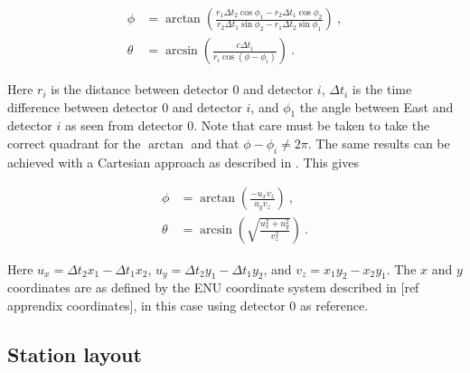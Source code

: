 \begin{equation}
    \label{eq:direction-2dflat}
    \begin{split}
        \phi &= \arctan \left(\frac{r_1 \Delta t_2 \cos \phi_1 - r_2 \Delta t_1 \cos \phi_2}{r_2 \Delta t_1 \sin \phi_2 - r_1 \Delta t_2 \sin \phi_1} \right) \ , \\
        \theta &= \arcsin \left(\frac{c \Delta t_i}{r_i \cos(\phi - \phi_i)} \right) \ .
    \end{split}
\end{equation}

Here $r_i$ is the distance between detector 0 and detector $i$, $\Delta t_i$ is the time difference between detector 0 and detector $i$, and $\phi_1$ the angle between East and detector $i$ as seen from detector 0. Note that care must be taken to take the correct quadrant for the $\arctan$ and that $\phi - \phi_i \ne 2 \pi$. The same results can be achieved with a Cartesian approach as described in \cite{montanus2015direction}. This gives

\begin{equation}
    \label{eq:direction-2dflat}
    \begin{split}
        \phi &= \arctan \left(\frac{-u_x v_z}{u_y v_z} \right) \ , \\
        \theta &= \arcsin \left(\sqrt{\frac{u_x^2+u_y^2}{v_z^2}} \right) \ .
    \end{split}
\end{equation}

Here $u_x = \Delta t_2 x_1 - \Delta t_1 x_2$, $u_y = \Delta t_2 y_1 - \Delta t_1 y_2$, and $v_z = x_1 y_2 - x_2 y_1$. The $x$ and $y$ coordinates are as defined by the ENU coordinate system described in [ref apprendix coordinates], in this case using detector 0 as reference.

\subsection{Station layout}
\label{ssec:station_layout}

